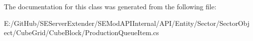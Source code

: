 The documentation for this class was generated from the following file\+:\begin{DoxyCompactItemize}
\item 
E\+:/\+Git\+Hub/\+S\+E\+Server\+Extender/\+S\+E\+Mod\+A\+P\+I\+Internal/\+A\+P\+I/\+Entity/\+Sector/\+Sector\+Object/\+Cube\+Grid/\+Cube\+Block/Production\+Queue\+Item.\+cs\end{DoxyCompactItemize}
